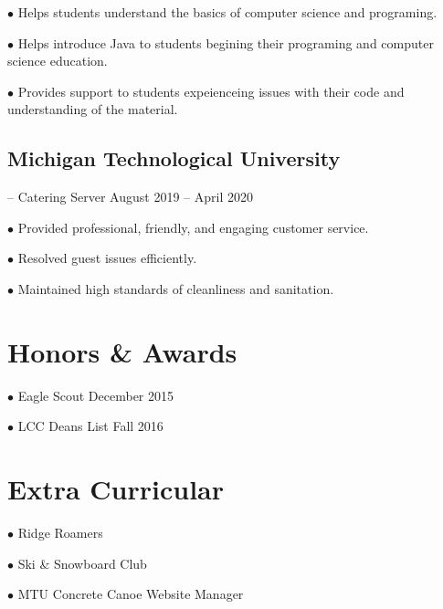 \documentclass{article}
\begin{document}
$\bullet$ Helps students understand the basics of computer science and programing.

$\bullet$ Helps introduce Java to students begining their programing and computer science education.

$\bullet$ Provides support to students expeienceing issues with their code and understanding of the material.


\subsection{Michigan Technological University}-- Catering Server \hfill August 2019 -- April 2020

$\bullet$ Provided professional, friendly, and engaging customer service.

$\bullet$ Resolved guest issues efficiently.

$\bullet$ Maintained high standards of cleanliness and sanitation.



\section{Honors \& Awards}

$\bullet$ Eagle Scout \hfill December 2015

$\bullet$ LCC Deans List \hfill Fall 2016


\section{Extra Curricular}

$\bullet$ Ridge Roamers

$\bullet$ Ski \& Snowboard Club

$\bullet$ MTU Concrete Canoe Website Manager
\end{document}
